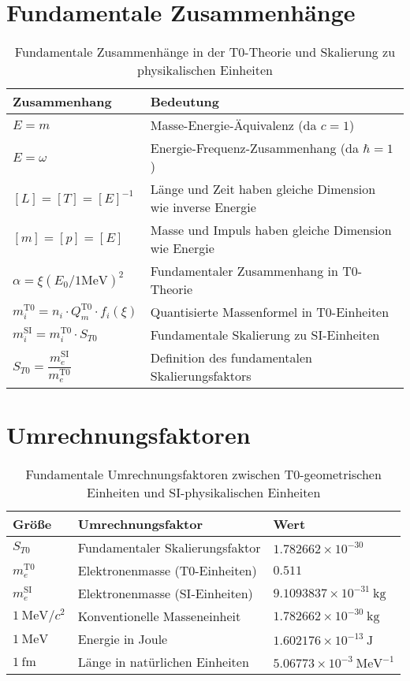 \documentclass[12pt,a4paper]{article}
\begin{document}
	\section{Fundamentale Zusammenhänge}
	
	\begin{table}[h]
		\centering
		\begin{tabular}{p{4cm}p{10cm}}
			\toprule
			\textbf{Zusammenhang} & \textbf{Bedeutung} \\
			\midrule
			$E = m$ & Masse-Energie-Äquivalenz (da $c=1$) \\
			$E = \omega$ & Energie-Frequenz-Zusammenhang (da $\hbar=1$) \\
			$[L] = [T] = [E]^{-1}$ & Länge und Zeit haben gleiche Dimension wie inverse Energie \\
			$[m] = [p] = [E]$ & Masse und Impuls haben gleiche Dimension wie Energie \\
			$\alpha = \xi (E_0/1\mathrm{MeV})^2$ & Fundamentaler Zusammenhang in T0-Theorie \\
			$m_i^{\mathrm{T0}} = n_i \cdot Q_m^{\mathrm{T0}} \cdot f_i(\xi)$ & Quantisierte Massenformel in T0-Einheiten \\
			$m_i^{\mathrm{SI}} = m_i^{\mathrm{T0}} \cdot S_{T0}$ & Fundamentale Skalierung zu SI-Einheiten \\
			$S_{T0} = \dfrac{m_e^{\mathrm{SI}}}{m_e^{\mathrm{T0}}}$ & Definition des fundamentalen Skalierungsfaktors \\
			\bottomrule
		\end{tabular}
		\caption{Fundamentale Zusammenhänge in der T0-Theorie und Skalierung zu physikalischen Einheiten}
	\end{table}
	
	\section{Umrechnungsfaktoren}
	
	\begin{table}[h]
		\centering
		\begin{tabular}{lll}
			\toprule
			\textbf{Größe} & \textbf{Umrechnungsfaktor} & \textbf{Wert} \\
			\midrule
			$S_{T0}$ & Fundamentaler Skalierungsfaktor & $1.782662 \times 10^{-30}$ \\
			$m_e^{\mathrm{T0}}$ & Elektronenmasse (T0-Einheiten) & $0.511$ \\
			$m_e^{\mathrm{SI}}$ & Elektronenmasse (SI-Einheiten) & $9.1093837 \times 10^{-31}~\mathrm{kg}$ \\
			$1~\mathrm{MeV}/c^2$ & Konventionelle Masseneinheit & $1.782662 \times 10^{-30}~\mathrm{kg}$ \\
			$1~\mathrm{MeV}$ & Energie in Joule & $1.602176 \times 10^{-13}~\mathrm{J}$ \\
			$1~\mathrm{fm}$ & Länge in natürlichen Einheiten & $5.06773 \times 10^{-3}~\mathrm{MeV}^{-1}$ \\
			\bottomrule
		\end{tabular}
		\caption{Fundamentale Umrechnungsfaktoren zwischen T0-geometrischen Einheiten und SI-physikalischen Einheiten}
	\end{table}
	
\end{document}
